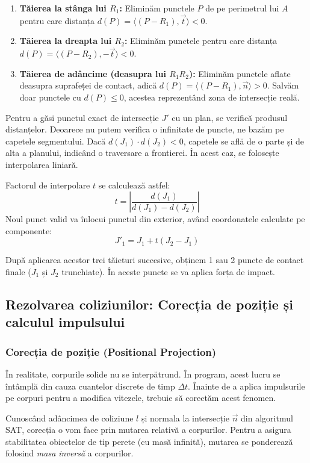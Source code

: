 \documentclass[12pt, a4paper]{article}
\begin{document}
\begin{enumerate}
    \item \textbf{Tăierea la stânga lui $R_1$:} Eliminăm punctele $P$ de pe perimetrul lui $A$ pentru care distanța $d(P) = \langle (P - R_1), \vec{t} \rangle < 0$.
    \item \textbf{Tăierea la dreapta lui $R_2$:} Eliminăm punctele pentru care distanța $d(P) = \langle (P - R_2), -\vec{t} \rangle < 0$.
    \item \textbf{Tăierea de adâncime (deasupra lui $R_1 R_2$):} Eliminăm punctele aflate deasupra suprafeței de contact, adică $d(P) = \langle (P - R_1), \vec{n} \rangle > 0$. Salvăm doar punctele cu $d(P) \le 0$, acestea reprezentând zona de intersecție reală.
\end{enumerate}

Pentru a găsi punctul exact de intersecție $J'$ cu un plan, se verifică produsul distanțelor. Deoarece nu putem verifica o infinitate de puncte, ne bazăm pe capetele segmentului. Dacă $d(J_1) \cdot d(J_2) < 0$, capetele se află de o parte și de alta a planului, indicând o traversare a frontierei. În acest caz, se folosește interpolarea liniară.

Factorul de interpolare $t$ se calculează astfel:
$$ t = \left| \frac{d(J_1)}{d(J_1) - d(J_2)} \right| $$
Noul punct valid va înlocui punctul din exterior, având coordonatele calculate pe componente:
$$ J'_1 = J_1 + t(J_2 - J_1) $$

După aplicarea acestor trei tăieturi succesive, obținem 1 sau 2 puncte de contact finale ($J_1$ și $J_2$ trunchiate). În aceste puncte se va aplica forța de impact.
\subsection{Rezolvarea coliziunilor: Corecția de poziție și calculul impulsului}

\subsubsection{Corecția de poziție (Positional Projection)}
În realitate, corpurile solide nu se interpătrund. În program, acest lucru se întâmplă din cauza cuantelor discrete de timp $\Delta t$. Înainte de a aplica impulsurile pe corpuri pentru a modifica vitezele, trebuie să corectăm acest fenomen.

Cunoscând adâncimea de coliziune $l$ și normala la intersecție $\vec{n}$ din algoritmul SAT, corecția o vom face prin mutarea relativă a corpurilor. Pentru a asigura stabilitatea obiectelor de tip perete (cu masă infinită), mutarea se ponderează folosind \textit{masa inversă} a corpurilor. 
\end{document}
